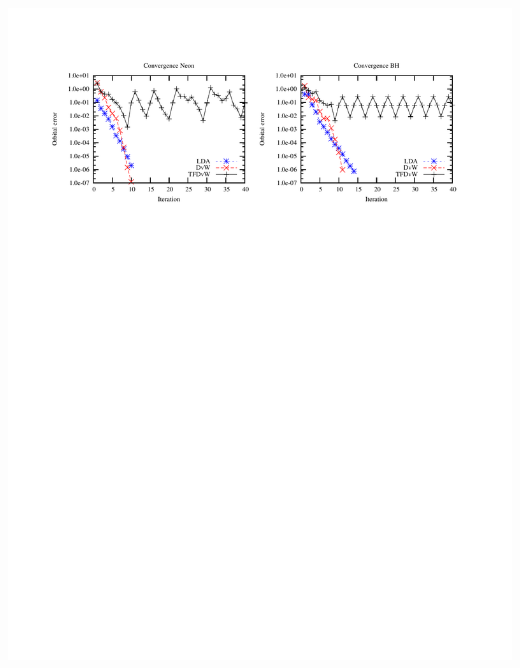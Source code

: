 \documentclass[mathserif, 8pt]{beamer}
\begin{document}
\begin{frame}
    \includegraphics[scale=0.6, viewport = 50 560 550 730]{figures/convergence.pdf}\\
\end{frame}
\end{document}
